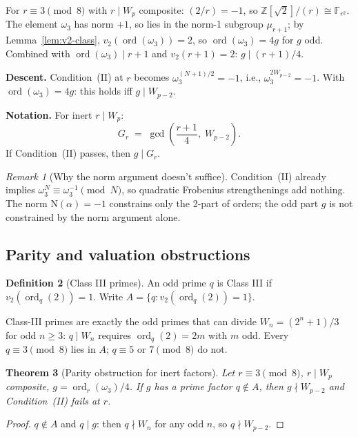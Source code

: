\documentclass[11pt]{amsart}
\theoremstyle{plain}
\newtheorem{theorem}{Theorem}[section]
\theoremstyle{definition}
\newtheorem{definition}[theorem]{Definition}
\theoremstyle{remark}
\newtheorem{remark}[theorem]{Remark}
\numberwithin{equation}{section}
\newcommand{\ord}{\operatorname{ord}}
\newcommand{\Z}{\mathbb{Z}}
\newcommand{\F}{\mathbb{F}}
\begin{document}
For $r \equiv 3 \pmod 8$ with $r \mid W_p$ composite: $(2/r) = -1$, so $\Z[\sqrt 2]/(r) \cong \F_{r^2}$. The element $\omega_3$ has norm $+1$, so lies in the norm-1 subgroup $\mu_{r+1}$; by Lemma~\ref{lem:v2-class}, $v_2(\ord(\omega_3)) = 2$, so $\ord(\omega_3) = 4 g$ for $g$ odd. Combined with $\ord(\omega_3) \mid r + 1$ and $v_2(r + 1) = 2$: $g \mid (r+1)/4$.

\textbf{Descent.} Condition~(II) at $r$ becomes $\omega_3^{(N+1)/2} = -1$, i.e., $\omega_3^{2 W_{p-2}} = -1$. With $\ord(\omega_3) = 4 g$: this holds iff $g \mid W_{p-2}$.

\textbf{Notation.} For inert $r \mid W_p$:
\[
  G_r \;=\; \gcd\!\left(\frac{r+1}{4},\; W_{p-2}\right).
\]
If Condition~(II) passes, then $g \mid G_r$.

\begin{remark}[Why the norm argument doesn't suffice]\label{rem:norm-insufficient}
Condition~(II) already implies $\omega_3^N \equiv \omega_3^{-1} \pmod N$, so quadratic Frobenius strengthenings \cite{ref:Grantham} add nothing. The norm $\mathrm{N}(\alpha) = -1$ constrains only the 2-part of orders; the odd part $g$ is not constrained by the norm argument alone.
\end{remark}

\subsection{Parity and valuation obstructions}

\begin{definition}[Class III primes]\label{def:classIII}
An odd prime $q$ is Class III if $v_2(\ord_q(2)) = 1$. Write $A = \{q : v_2(\ord_q(2)) = 1\}$.
\end{definition}

Class-III primes are exactly the odd primes that can divide $W_n = (2^n + 1)/3$ for odd $n \geq 3$: $q \mid W_n$ requires $\ord_q(2) = 2 m$ with $m$ odd. Every $q \equiv 3 \pmod 8$ lies in $A$; $q \equiv 5$ or $7 \pmod 8$ do not.

\begin{theorem}[Parity obstruction for inert factors]\label{thm:parity-obstruction}
Let $r \equiv 3 \pmod 8$, $r \mid W_p$ composite, $g = \ord_r(\omega_3)/4$. If $g$ has a prime factor $q \notin A$, then $g \nmid W_{p-2}$ and Condition~(II) fails at $r$.
\end{theorem}

\begin{proof}
$q \notin A$ and $q \mid g$: then $q \nmid W_n$ for any odd $n$, so $q \nmid W_{p-2}$.
\end{proof}
\end{document}
